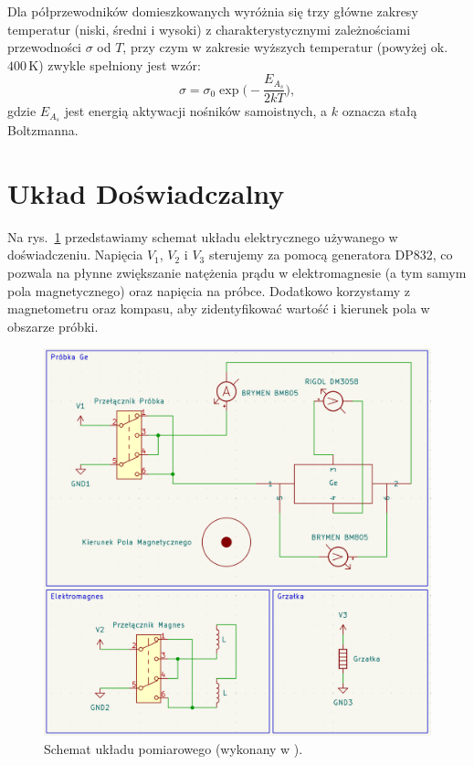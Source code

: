 \documentclass[12pt]{article}
\begin{document}
Dla półprzewodników domieszkowanych wyróżnia się trzy główne zakresy temperatur (niski, średni i wysoki) z charakterystycznymi zależnościami przewodności $\sigma$ od $T$, przy czym w zakresie wyższych temperatur (powyżej ok. $400\,\mathrm{K}$) zwykle spełniony jest wzór:
\begin{equation}
    \sigma = \sigma_0 \exp\!\biggl(-\frac{E_{A_s}}{2kT}\biggr),
    \label{eq:high_temp}
\end{equation}
gdzie $E_{A_s}$ jest energią aktywacji nośników samoistnych, a $k$ oznacza stałą Boltzmanna.

\section{Układ Doświadczalny}
Na rys.~\ref{fig:diagram} przedstawiamy schemat układu elektrycznego używanego w doświadczeniu. Napięcia $V_1$, $V_2$ i $V_3$ sterujemy za pomocą generatora DP832, co pozwala na płynne zwiększanie natężenia prądu w elektromagnesie (a tym samym pola magnetycznego) oraz napięcia na próbce. Dodatkowo korzystamy z magnetometru oraz kompasu, aby zidentyfikować wartość i kierunek pola w obszarze próbki.

\begin{figure}[H]
    \centering
    \includegraphics[scale=0.28]{diagram}
    \caption{Schemat układu pomiarowego (wykonany w \cite{diagram}).}
    \label{fig:diagram}
\end{figure}
\end{document}
